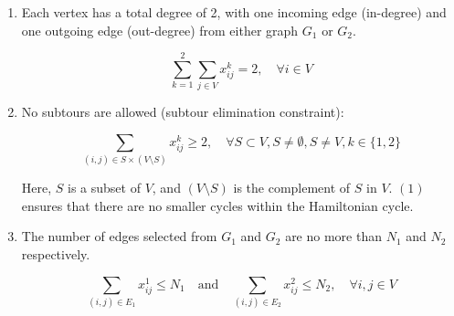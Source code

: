 \documentclass{article}
\begin{document}
\begin{enumerate}
  \item Each vertex has a total degree of 2, with one incoming edge (in-degree) and one
        outgoing edge (out-degree) from either graph $G_1$ or $G_2$.

        \begin{equation*}
          \sum_{k=1}^{2} \sum_{j \in V} x_{ij}^k = 2, \quad \forall i \in V
        \end{equation*}
  \item No subtours are allowed (subtour elimination constraint):

        \begin{equation}
          \sum_{(i,j) \in S \times (V \setminus S)} x_{ij}^k \geq 2, \quad \forall S \subset V, S \neq \emptyset, S \neq V, k \in \{1, 2\}
        \end{equation}

        Here, $S$ is a subset of $V$, and $(V \setminus S)$ is the complement of $S$ in
        $V$. $(1)$ ensures that there are no smaller cycles within the Hamiltonian
        cycle.
  \item The number of edges selected from $G_1$ and $G_2$ are no more than $N_1$ and
        $N_2$ respectively.

        \begin{equation*}
          \sum_{(i,j) \in E_1} x_{ij}^1 \leq N_1 \quad \text{and} \quad \sum_{(i,j) \in E_2} x_{ij}^2 \leq N_2,  \quad \forall i,j \in V
        \end{equation*}
\end{enumerate}
\end{document}
